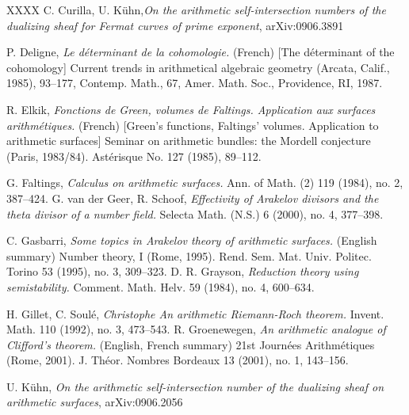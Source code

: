 \documentclass[]{amsart}
\theoremstyle{plain}
\theoremstyle{remark} \newtheorem{remark}[thm]{Remark}
\theoremstyle{remark} \newtheorem{exercise}{Exercise}
\theoremstyle{remark} \newtheorem{example}{Example}
\numberwithin{equation}{section}
\begin{document}
\begin{thebibliography}{XXXX}
C. Curilla, U. Kühn,{\em On the arithmetic self-intersection numbers of the dualizing sheaf for Fermat curves of prime exponent}, arXiv:0906.3891

P. Deligne, {\em Le déterminant de la cohomologie.} (French) [The d\'{e}terminant of the cohomology] Current trends in arithmetical algebraic geometry (Arcata, Calif., 1985), 93--177, Contemp. Math., 67, Amer. Math. Soc., Providence, RI, 1987. 

R. Elkik, {\em
Fonctions de Green, volumes de Faltings. Application aux surfaces arithmétiques.} (French) [Green's functions, Faltings' volumes. Application to arithmetic surfaces]
Seminar on arithmetic bundles: the Mordell conjecture (Paris, 1983/84).
Astérisque No. 127 (1985), 89--112.

G. Faltings, {\em Calculus on arithmetic surfaces.}
Ann. of Math. (2) 119 (1984), no. 2, 387--424.
G. van der Geer, R. Schoof, {\em Effectivity of Arakelov divisors and the theta divisor of a number field.}
Selecta Math. (N.S.) 6 (2000), no. 4, 377--398.

C. Gasbarri, {\em 
Some topics in Arakelov theory of arithmetic surfaces.} (English summary)
Number theory, I (Rome, 1995).
Rend. Sem. Mat. Univ. Politec. Torino 53 (1995), no. 3, 309--323.
D. R. Grayson, {\em Reduction theory using semistability.} Comment. Math. Helv. 59 (1984), no. 4, 600--634.


H. Gillet, C. Soul\'{e}, {\em Christophe An arithmetic Riemann-Roch theorem.} Invent. Math. 110 (1992), no. 3, 473--543.
R. Groenewegen, {\em 
An arithmetic analogue of Clifford's theorem.} (English, French summary) 21st Journ\'{e}es Arithm\'{e}tiques (Rome, 2001).
J. Théor. Nombres Bordeaux 13 (2001), no. 1, 143--156.

U. Kühn, {\em On the arithmetic self-intersection number of the dualizing sheaf on arithmetic surfaces}, arXiv:0906.2056


\end{thebibliography}
\end{document}
